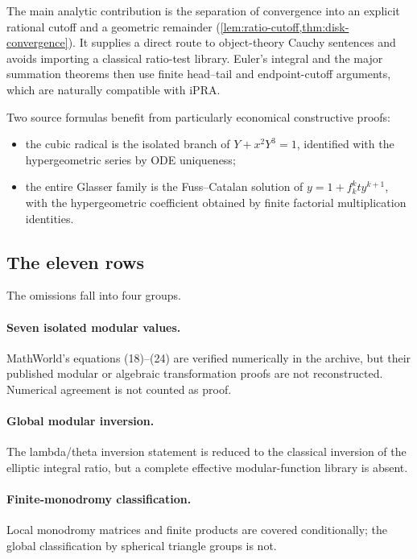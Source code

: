 The main analytic contribution is the separation of convergence into an
explicit rational cutoff and a geometric remainder
(\cref{lem:ratio-cutoff,thm:disk-convergence}).  It supplies a direct route to
object-theory Cauchy sentences and avoids importing a classical ratio-test
library.  Euler's integral and the major summation theorems then use finite
head--tail and endpoint-cutoff arguments, which are naturally compatible with
iPRA.

Two source formulas benefit from particularly economical constructive proofs:
\begin{itemize}
\item the cubic radical is the isolated branch of
\(Y+x^2Y^3=1\), identified with the hypergeometric series by ODE uniqueness;
\item the entire Glasser family is the Fuss--Catalan solution of
\(y=1+f_k^kty^{k+1}\), with the hypergeometric coefficient obtained by finite
factorial multiplication identities.
\end{itemize}

\subsection{The eleven \StatusD{} rows}

The omissions fall into four groups.

\paragraph{Seven isolated modular values.}
MathWorld's equations (18)--(24) are verified numerically in the archive, but
their published modular or algebraic transformation proofs are not
reconstructed.  Numerical agreement is not counted as proof.

\paragraph{Global modular inversion.}
The lambda/theta inversion statement is reduced to the classical inversion of
the elliptic integral ratio, but a complete effective modular-function
library is absent.

\paragraph{Finite-monodromy classification.}
Local monodromy matrices and finite products are covered conditionally; the
global classification by spherical triangle groups is not.

